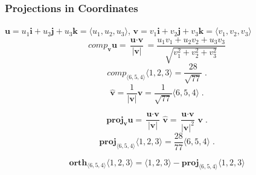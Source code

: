 \begin{frame}
  \frametitle{Projections in Coordinates}

$\textbf{u} = u_1 \textbf{i} + u_2 \textbf{j} + u_3 \textbf{k} = \langle u_1, u_2, u_3 \rangle$,
 $\textbf{v}=v_1 \textbf{i} + v_2 \textbf{j} + v_3 \textbf{k} = \langle v_1, v_2, v_3 \rangle$
%
$$comp_{\bm{v}} \textbf{u} = \frac{\textbf{u}\cdot \textbf{v}}{|\textbf{v}|} =
\frac{u_1v_1+u_2v_2+u_3v_3}{\sqrt{v_1^2+v_2^2+v_3^2}}$$
%
$$comp_{\langle 6,5,4\rangle} \langle 1,2,3\rangle = \frac{28}{\sqrt{77}}\; .$$
%
$$\hat{\textbf{v}} = \frac{1}{|\textbf{v}|} \textbf{v} =
\frac{1}{\sqrt{77}} \langle 6,5,4\rangle\; .$$

$$\textbf{proj}_{\bm{v}} \textbf{u} = \frac{\textbf{u} \cdot \textbf{v}}{|\textbf{v}|} \, \widehat{\textbf{v}} =
\frac{\textbf{u} \cdot \textbf{v}}{|\textbf{v}|^2} \, \textbf{v}\; .$$
%
$$\textbf{proj}_{\langle 6,5,4\rangle} \langle 1,2,3\rangle = \frac{28}{77} \langle 6,5,4\rangle\; .$$

$$\textbf{orth}_{\langle 6,5,4\rangle} \langle 1,2,3\rangle = \langle 1,2,3\rangle -
\textbf{proj}_{\langle 6,5,4\rangle} \langle 1,2,3\rangle$$

\end{frame}